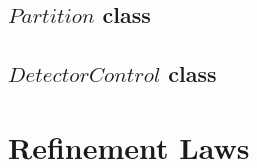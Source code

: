 \documentclass{article}
\begin{document}





\newpage


\subsection{$Partition$ class}
\label{app:Partition}\vspace{-1em}





\subsection{$DetectorControl$ class}
\label{app:DetectorControl}\vspace{-1em}



\newpage


\section{Refinement Laws}
\label{app:laws}

\setcounter{circuslawthm}{0}
\setcounter{circustimelawthm}{0}
\setcounter{ohcircuslawthm}{0}
\setcounter{patternthm}{0}
\end{document}
